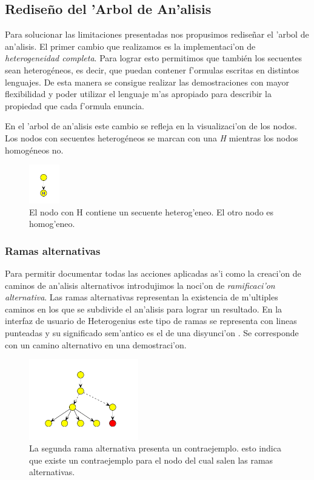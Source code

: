 \subsection{Rediseño del 'Arbol de An'alisis}

Para solucionar las limitaciones presentadas nos propusimos rediseñar el 'arbol de an'alisis.
El primer cambio que realizamos es la implementaci'on de \emph{heterogeneidad completa}.
Para lograr esto permitimos que también los secuentes sean heterogéneos, es decir, que puedan contener f'ormulas escritas en distintos lenguajes. De esta manera se consigue realizar las demostraciones con mayor flexibilidad y poder utilizar el lenguaje m'as apropiado para describir la propiedad que cada f'ormula enuncia.

En el 'arbol de an'alisis este cambio se refleja en la visualizaci'on de los nodos. Los nodos con secuentes heterogéneos se marcan con una \textit{H} mientras los nodos homogéneos no.

\begin{figure}[tbh]
	\includegraphics[width=50px]{img/hetero_homo.png}
	\centering
	\caption{El nodo con H contiene un secuente heterog'eneo. El otro nodo es homog'eneo.}
\end{figure}


\subsubsection{Ramas alternativas}

Para permitir documentar todas las acciones aplicadas as'i como la creaci'on de caminos de an'alisis alternativos introdujimos la noci'on de \textit{ramificaci'on alternativa}.
Las ramas alternativas representan la existencia de m'ultiples caminos en los que se subdivide el an'alisis para lograr un resultado. En la interfaz de usuario de Heterogenius este tipo de ramas se representa con lineas punteadas y su significado sem'antico es el de una disyunci'on . Se corresponde con un camino alternativo en una demostraci'on.

\begin{figure}[htb]
	\includegraphics[width=180px]{img/ramas_alternativas_2.png}
	\centering
	\caption{La segunda rama alternativa presenta un contraejemplo. esto indica que existe un contraejemplo para el nodo del cual salen las ramas alternativas.}
        \label{alter1}
\end{figure}

